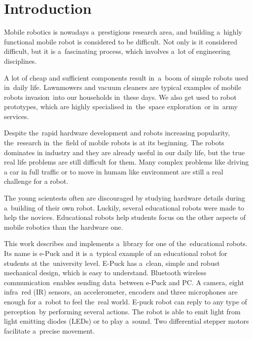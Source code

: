 \chapter{Introduction}
\label{chap:intro}
  Mobile robotics is nowadays a~prestigious research area, and building a~highly functional 
  mobile robot is considered to be difficult. 
  Not only is it considered difficult, but it is a~fascinating process, which
  involves a~lot of engineering disciplines.
  
  A lot of cheap and sufficient components result in~a~boom of simple robots used in~daily life. 
  Lawnmowers and vacuum cleaners are typical examples of mobile robots invasion~into our households in~these days.
  We also get used to robot prototypes, which are highly specialised in~the~space exploration~or in~army services.

  Despite the~rapid hardware development and robots increasing popularity,
  the~research in~the~field of mobile robots is at its beginning.
  The robots dominates in industry and they are already useful in our daily
  life, but the true real life problems are still difficult for them.
  Many complex problems like driving a car in full traffic or to move in humam
  like environment are still a real challenge for a robot.
   
  The young scientests often are discouraged by
  studying hardware details during a~building of their own robot.
  Luckily, several educational robots were made to help the novices.
  Educational robots help students focus on the other aspects of mobile robotics than the hardware one.
  
  This work describes and implements a~library for one of the~educational robots.
  Its name is e-Puck and it is a~typical example of an educational robot for students at the~university level. 
  E-Puck has a~clean, simple and robust mechanical design, which is easy to understand.
  Bluetooth wireless communication~enables sending data~between e-Puck and PC.
  A camera, eight infra~red (IR) sensors,	an accelerometer, encoders and three microphones 
  are enough for a~robot to feel the~real world.
  E-puck robot can reply to any type of perception~by performing several actions. 
  The robot is able to emit light from light emitting diodes (LEDs) or to play a~sound.
  Two differential stepper motors facilitate a~precise movement. 
  
